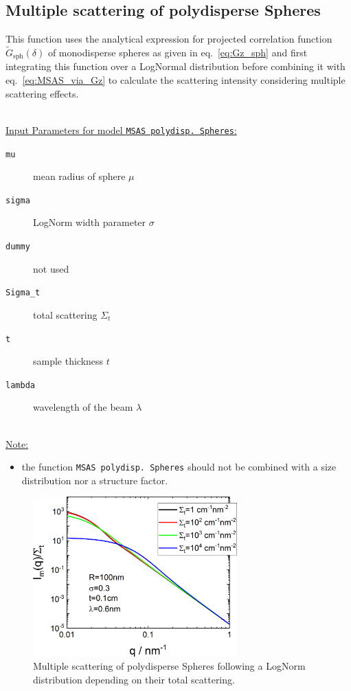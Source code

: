 \newpage
\subsection{Multiple scattering of polydisperse Spheres}

This function uses the analytical expression for projected correlation function $\tilde{G}_\mathrm{sph}(\delta)$ of monodisperse spheres as given in eq.\ \ref{eq:Gz_sph} and first integrating this function over a LogNormal distribution before combining it with eq.\ \ref{eq:MSAS_via_Gz} to calculate the scattering intensity considering multiple scattering effects.

\hspace{1pt}\\
\underline{Input Parameters for model \texttt{MSAS polydisp. Spheres}:}\\
\begin{description}
\item[\texttt{mu}] mean radius of sphere $\mu$
\item[\texttt{sigma}] LogNorm width parameter $\sigma$
\item[\texttt{dummy}] not used
\item[\texttt{Sigma\_t}] total scattering $\Sigma_t$
\item[\texttt{t}] sample thickness $t$
\item[\texttt{lambda}] wavelength of the beam $\lambda$
\end{description}

\hspace{1pt}\\
\underline{Note:}
\begin{itemize}
\item the function \texttt{MSAS polydisp. Spheres} should not be combined with a size distribution nor a structure factor.
\end{itemize}

\begin{figure}[htb]
\begin{center}
\includegraphics[width=0.7\textwidth]{../images/form_factor/MSAS/MSAS_polydispSpheres.png}
\end{center}
\caption{Multiple scattering of polydisperse Spheres following a LogNorm distribution depending on their total scattering.}
\label{fig:MSAS_polySpheres}
\end{figure}

